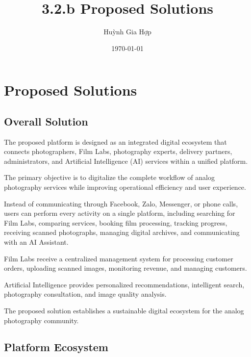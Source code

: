 \documentclass[12pt,a4paper]{article}
\title{3.2.b Proposed Solutions}
\author{Huỳnh Gia Hợp}
\date{\today}
\begin{document}
	
	\maketitle
	
	\tableofcontents
	
	\newpage
	
	
	\section{Proposed Solutions}
	
	
	\subsection{Overall Solution}
	
	The proposed platform is designed as an integrated digital ecosystem that connects photographers, Film Labs, photography experts, delivery partners, administrators, and Artificial Intelligence (AI) services within a unified platform.
	
	The primary objective is to digitalize the complete workflow of analog photography services while improving operational efficiency and user experience.
	
	Instead of communicating through Facebook, Zalo, Messenger, or phone calls, users can perform every activity on a single platform, including searching for Film Labs, comparing services, booking film processing, tracking progress, receiving scanned photographs, managing digital archives, and communicating with an AI Assistant.
	
	Film Labs receive a centralized management system for processing customer orders, uploading scanned images, monitoring revenue, and managing customers.
	
	Artificial Intelligence provides personalized recommendations, intelligent search, photography consultation, and image quality analysis.
	
	The proposed solution establishes a sustainable digital ecosystem for the analog photography community.
	
	
	\subsection{Platform Ecosystem}
	
\end{document}
